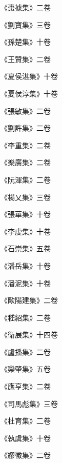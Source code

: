 \begin{pinyinscope}
 《棗據集》二卷



 《劉寶集》三卷



 《孫楚集》十卷



 《王贊集》二卷



 《夏侯湛集》十卷



 《夏侯淳集》十卷



 《張敏集》二卷



 《劉許集》二卷



 《李重集》二卷



 《樂廣集》二卷



 《阮渾集》二卷



 《楊乂集》三卷



 《張華集》十卷



 《李虔集》十卷



 《石崇集》五卷



 《潘岳集》十卷



 《潘泥集》十卷



 《歐陽建集》二卷



 《嵇紹集》二卷



 《衛展集》十四卷



 《盧播集》二卷



 《欒肇集》五卷



 《應亨集》二卷



 《司馬彪集》三卷



 《杜育集》二卷



 《執虞集》十卷



 《繆徵集》二卷




\end{pinyinscope}
